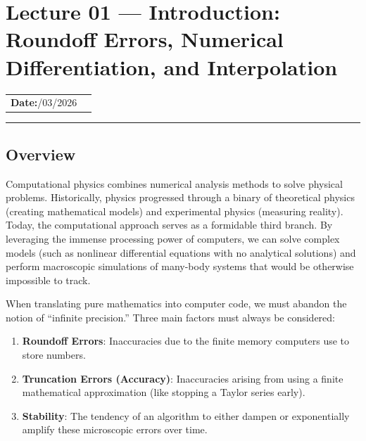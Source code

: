 
\section{Lecture 01 — Introduction: Roundoff Errors, Numerical
  Differentiation, and Interpolation}\label{sec:lec01}

\begin{center}
\begin{tabular}{ll}
  \textbf{Date:}\quad 26/03/2026 & \\
\end{tabular}
\end{center}
\hrule\vspace{1.5em}

\subsection*{Overview}

Computational physics combines numerical analysis methods to solve physical
problems. Historically, physics progressed through a binary of theoretical
physics (creating mathematical models) and experimental physics (measuring
reality). Today, the computational approach serves as a formidable third
branch. By leveraging the immense processing power of computers, we can
solve complex models (such as nonlinear differential equations with no
analytical solutions) and perform macroscopic simulations of many-body
systems that would be otherwise impossible to track.

When translating pure mathematics into computer code, we must abandon the
notion of ``infinite precision.'' Three main factors must always be
considered:
\begin{enumerate}
    \item \textbf{Roundoff Errors}: Inaccuracies due to the finite memory
    computers use to store numbers.
    \item \textbf{Truncation Errors (Accuracy)}: Inaccuracies arising from
    using a finite mathematical approximation (like stopping a Taylor series
    early).
    \item \textbf{Stability}: The tendency of an algorithm to either dampen
    or exponentially amplify these microscopic errors over time.
\end{enumerate}

